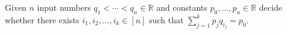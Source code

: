 \begin{problem}[\(k\)-LDT]
 Given \(n\) input numbers \(q_1 < \cdots < q_n \in\mathbb{R}\)
 and constants
 $p_0, \ldots, p_n \in \mathbb{R}$
 decide whether there exists \(i_1, i_2,\ldots ,i_k \in [n]\) such that
 \(\sum_{j=1}^k p_j q_{i_j} = p_0\).
\end{problem}
